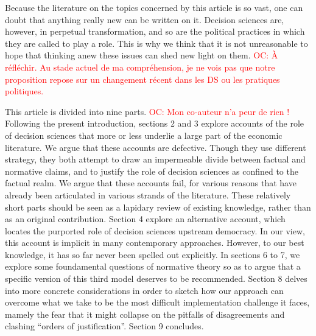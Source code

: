 \documentclass[preprint, french, english, 11pt]{elsarticle}%
\newcommand{\commentOC}[1]{\textcolor{red}{OC: #1}}
\begin{document}
Because the literature on the topics concerned by this article is so vast, one can doubt that anything really new can be written on it. Decision sciences are, however, in perpetual transformation, and so are the political practices in which they are called to play a role. This is why we think that it is not unreasonable to hope that thinking anew these issues can shed new light on them.
\commentOC{À réfléchir. Au stade actuel de ma compréhension, je ne vois pas que notre proposition repose sur un changement récent dans les DS ou les pratiques politiques.}

This article is divided into nine parts. \commentOC{Mon co-auteur n’a peur de rien !}
Following the present introduction, sections 2 and 3 explore accounts of the role of decision sciences that more or less underlie a large part of the economic literature. We argue that these accounts are defective. Though they use different strategy, they both attempt to draw an impermeable divide between factual and normative claims, and to justify the role of decision sciences as confined to the factual realm. We argue that these accounts fail, for various reasons that have already been articulated in various strands of the literature. These relatively short parts should be seen as a lapidary review of existing knowledge, rather than as an original contribution. Section 4 explore an alternative account, which locates the purported role of decision sciences upstream democracy. In our view, this account is implicit in many contemporary approaches. However, to our best knowledge, it has so far never been spelled out explicitly. In sections 6 to 7, we explore some foundamental questions of normative theory so as to argue that a specific version of this third model deserves to be recommended. Section 8 delves into more concrete considerations in order to sketch how our approach can overcome what we take to be the most difficult implementation challenge it faces, mamely the fear that it might collapse on the pitfalls of disagreements and clashing ``orders of justification''. Section 9 concludes.
\end{document}
